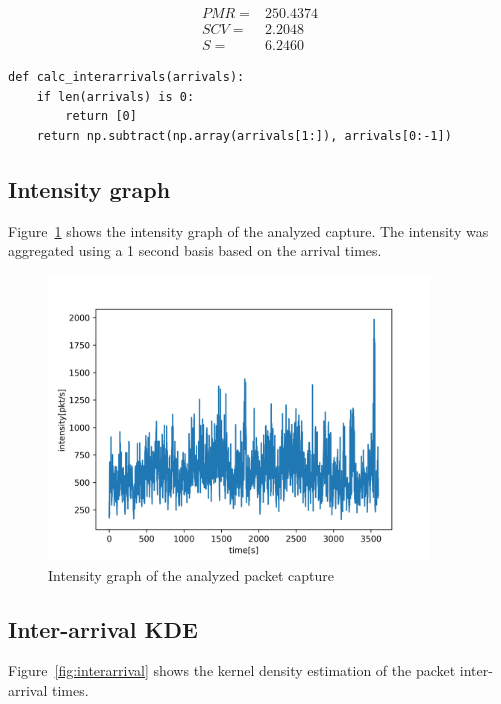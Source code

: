 \documentclass[a4paper]{article}
\begin{document}
 \begin{align*} 
& PMR = & 250.4374 & \\
& SCV = & 2.2048  & \\
& S   = & 6.2460 &
\end{align*} 

 
\begin{lstlisting}[style=mypython,caption={The functions used for calculating IDI and IDC},label={lst:interarr}]
def calc_interarrivals(arrivals):
    if len(arrivals) is 0:
        return [0]
    return np.subtract(np.array(arrivals[1:]), arrivals[0:-1])
\end{lstlisting}


\subsection{Intensity graph}

Figure~\ref{fig:intensity} shows the intensity graph of the analyzed capture. The intensity was aggregated using a 1 second basis based on the arrival times.

\begin{figure}[H]
    \centering
    \includegraphics[width=0.9\textwidth]{figures/intensity.png}
    \caption{Intensity graph of the analyzed packet capture}
    \label{fig:intensity}
\end{figure}

\subsection{Inter-arrival KDE}

Figure~\ref{fig:interarrival} shows the kernel density estimation of the packet inter-arrival times.
\end{document}
